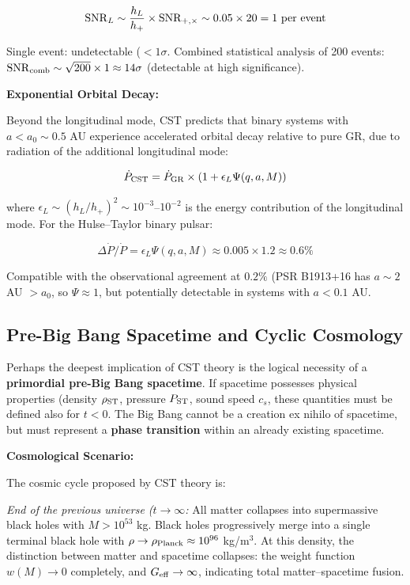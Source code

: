 \documentclass[10pt,a4paper]{article}
\begin{document}
\[{\rm SNR}_L \sim \frac{h_L}{h_+} \times {\rm SNR}_{+,\times} \sim 0.05 \times 20 = 1~{\rm per~event}\]

Single event: undetectable (\(< 1\sigma\). Combined statistical
analysis of 200 events:
\({\rm SNR}_{\rm comb} \sim \sqrt{200} \times 1 \approx 14\sigma\)
(detectable at high significance).

\textbf{Exponential Orbital Decay:}

Beyond the longitudinal mode, CST predicts that binary systems with
\(a < a_0 \sim 0.5\) AU experience accelerated orbital decay relative to
pure GR, due to radiation of the additional longitudinal mode:

\[\dot{P}_{\rm CST} = \dot{P}_{\rm GR} \times \left(1 + \epsilon_L \Psi(q,a,M)\right)\]

where \(\epsilon_L \sim (h_L/h_+)^2 \sim 10^{-3}\)--\(10^{-2}\) is the
energy contribution of the longitudinal mode. For the Hulse--Taylor \cite{Hulse1975}
binary pulsar:

\[\Delta\dot{P}/\dot{P} = \epsilon_L \Psi(q,a,M) \approx 0.005 \times 1.2 \approx 0.6\%\]

Compatible with the observational agreement at \(0.2\%\) (PSR B1913+16
has \(a \sim 2\) AU \(> a_0\), so \(\Psi \approx 1\), but potentially
detectable in systems with \(a < 0.1\) AU.

\subsection{Pre-Big Bang Spacetime and Cyclic
Cosmology}\label{pre-big-bang-spacetime-and-cyclic-cosmology}

Perhaps the deepest implication of CST theory is the logical necessity
of a \textbf{primordial pre-Big Bang spacetime}. If spacetime possesses
physical properties (density \(\rho_{\rm ST}\), pressure \(P_{\rm ST}\),
sound speed \(c_s\), these quantities must be defined also for
\(t < 0\). The Big Bang cannot be a creation ex nihilo of spacetime, but
must represent a \textbf{phase transition} within an already existing
spacetime.

\textbf{Cosmological Scenario:}

The cosmic cycle proposed by CST theory is:

\emph{End of the previous universe (\(t \to \infty\):} All matter
collapses into supermassive black holes with \(M > 10^{53}\) kg. Black
holes progressively merge into a single terminal black hole with
\(\rho \to \rho_{\rm Planck} \approx 10^{96}\) kg/m$^{3}$. At this density,
the distinction between matter and spacetime collapses: the weight
function \(w(M) \to 0\) completely, and \(G_{\rm eff} \to \infty\),
indicating total matter--spacetime fusion.
\end{document}
